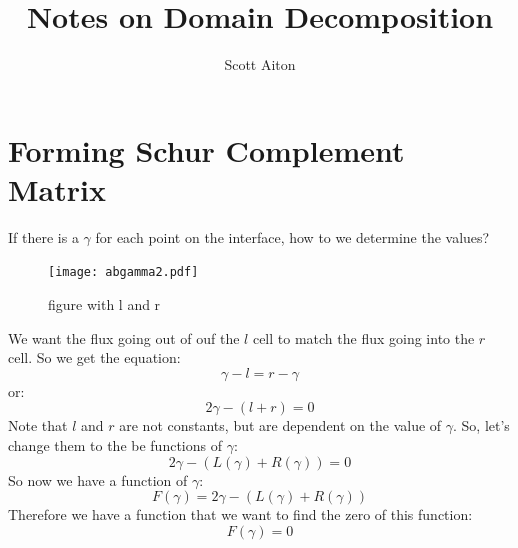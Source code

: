 \documentclass[12pt]{article}
\begin{document}
\title{Notes on Domain Decomposition}
\author{Scott Aiton}
\maketitle

\section{Forming Schur Complement Matrix}

If there is a $\gamma$ for each point on the interface, how to we determine the values?

\begin{figure}[H]
    \centering
    \texttt{[image: abgamma2.pdf]}
    \caption{figure with l and r}
\end{figure}

We want the flux going out of ouf the $l$ cell to match the flux going into the $r$ cell.
So we get the equation:
\begin{equation}
\gamma-l=r-\gamma
\end{equation}
or:
\begin{equation}
2\gamma-(l+r)=0
\end{equation}
Note that $l$ and $r$ are not constants, but are dependent on the value of $\gamma$.
So, let's change them to the be functions of $\gamma$:
\begin{equation}
2\gamma-(L(\gamma)+R(\gamma))=0
\end{equation}
So now we have a function of $\gamma$:
\begin{equation}
F(\gamma)=2\gamma-(L(\gamma)+R(\gamma))
    \label{function}
\end{equation}
Therefore we have a function that we want to find the zero of this function:
\begin{equation}
F(\gamma)=0
\end{equation}
\end{document}
